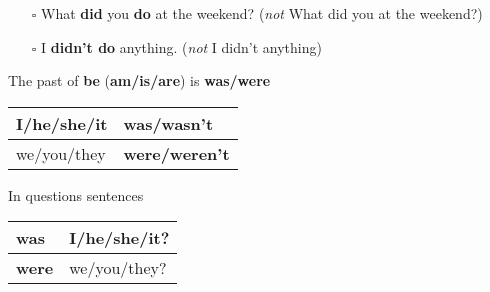 \begin{itemize}
    \item[$\square$] What \textbf{did} you \textbf{do} at the weekend? (\textit{not} What did you at the weekend?)
    \item[$\square$] I \textbf{didn't do} anything. (\textit{not} I didn't anything)
\end{itemize}
The past of \textbf{be} (\textbf{am/is/are}) is \textbf{was/were}
\begin{flushleft}
\begin{tabular}{ | l l | }
 \hline
 I/he/she/it      & \textbf{was/wasn't} \\
 \hline
 we/you/they      & \textbf{were/weren't} \\
 \hline
\end{tabular}
\end{flushleft}
In questions sentences
\begin{flushleft}
\begin{tabular}{ | l l | }
 \hline
 \textbf{was}       & I/he/she/it? \\
 \hline
 \textbf{were}      & we/you/they? \\
 \hline
\end{tabular}
\end{flushleft}

